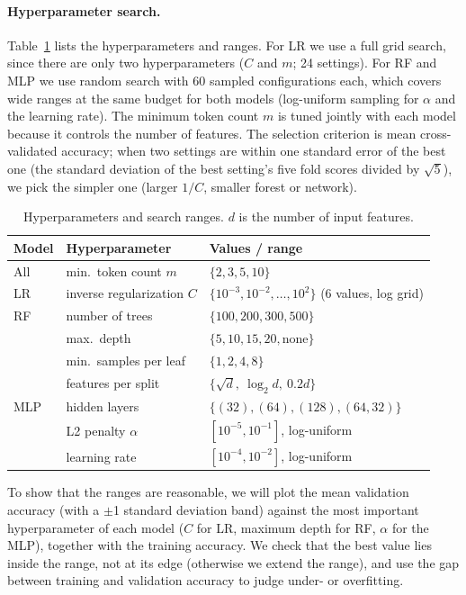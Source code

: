 \documentclass[11pt,titlepage]{article}
\begin{document}
\paragraph{Hyperparameter search.}
Table~\ref{tab:hparams} lists the hyperparameters and ranges. For LR we use a full
grid search, since there are only two hyperparameters ($C$ and $m$; 24 settings).
For RF and MLP we use random
search with 60 sampled configurations each, which covers wide ranges at the same
budget for both models (log-uniform sampling for $\alpha$ and the learning rate).
The minimum token count $m$ is tuned jointly with each model because it controls
the number of features. The selection criterion is mean cross-validated
accuracy; when two settings are within one standard error of the best one (the
standard deviation of the best setting's five fold scores divided by $\sqrt{5}$), we
pick the simpler one (larger $1/C$, smaller forest or network).

\begin{table}[h]
\centering\small
\begin{tabular}{@{}lll@{}}
\toprule
Model & Hyperparameter & Values / range\\
\midrule
All & min.\ token count $m$ & $\{2, 3, 5, 10\}$\\
\midrule
LR  & inverse regularization $C$ & $\{10^{-3}, 10^{-2}, \dots, 10^{2}\}$ (6 values, log grid)\\
\midrule
RF  & number of trees & $\{100, 200, 300, 500\}$\\
    & max.\ depth & $\{5, 10, 15, 20, \text{none}\}$\\
    & min.\ samples per leaf & $\{1, 2, 4, 8\}$\\
    & features per split & $\{\sqrt{d},\ \log_2 d,\ 0.2d\}$\\
\midrule
MLP & hidden layers & $\{(32), (64), (128), (64, 32)\}$\\
    & L2 penalty $\alpha$ & $[10^{-5}, 10^{-1}]$, log-uniform\\
    & learning rate & $[10^{-4}, 10^{-2}]$, log-uniform\\
\bottomrule
\end{tabular}
\caption{Hyperparameters and search ranges. $d$ is the number of input features.}
\label{tab:hparams}
\end{table}

To show that the ranges are reasonable, we will plot the mean validation accuracy
(with a $\pm$1 standard deviation band) against the most important hyperparameter
of each model ($C$ for LR, maximum depth for RF, $\alpha$ for the MLP), together
with the training accuracy. We check that the best value lies inside the range,
not at its edge (otherwise we extend the range), and use the gap between training
and validation accuracy to judge under- or overfitting.
\end{document}
